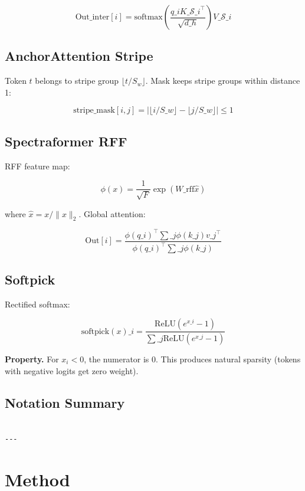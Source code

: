 \[
\text{Out}\_\text{inter}[i] = \text{softmax}\!\left(\frac{q\_i K\_{\mathcal{S}\_i}^\top}{\sqrt{d\_h}}\right) V\_{\mathcal{S}\_i}
\tag{3.8}
\]

\subsection{AnchorAttention Stripe}

Token $t$ belongs to stripe group $\lfloor t / S_w \rfloor$. Mask keeps 
stripe groups within distance 1:

\[
\text{stripe\_mask}[i, j] = \left|\lfloor i / S\_w \rfloor - \lfloor j / S\_w \rfloor\right| \leq 1
\tag{3.9}
\]

\subsection{Spectraformer RFF}

RFF feature map:

\[
\phi(x) = \frac{1}{\sqrt{F}} \exp(W\_\text{rff} \hat{x})
\tag{3.10}
\]

where $\hat{x} = x / \|x\|_2$. Global attention:

\[
\text{Out}[i] = \frac{\phi(q\_i)^\top \sum\_j \phi(k\_j) v\_j^\top}{\phi(q\_i)^\top \sum\_j \phi(k\_j)}
\tag{3.11}
\]

\subsection{Softpick}

Rectified softmax:

\[
\text{softpick}(x)\_i = \frac{\text{ReLU}(e^{x\_i} - 1)}{\sum\_j \text{ReLU}(e^{x\_j} - 1)}
\tag{3.12}
\]

\textbf{Property.} For $x_i < 0$, the numerator is 0. This produces natural 
sparsity (tokens with negative logits get zero weight).

\subsection{Notation Summary}

\begin{lstlisting}

---
\end{lstlisting}

\section{Method}

